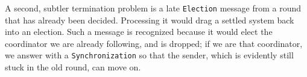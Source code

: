 A second, subtler termination problem is a late \texttt{Election} message from a round that has already been decided. Processing it would drag a settled system back into an election. Such a message is recognized because it would elect the coordinator we are already following, and is dropped; if we are that coordinator, we answer with a \texttt{Synchronization} so that the sender, which is evidently still stuck in the old round, can move on.
